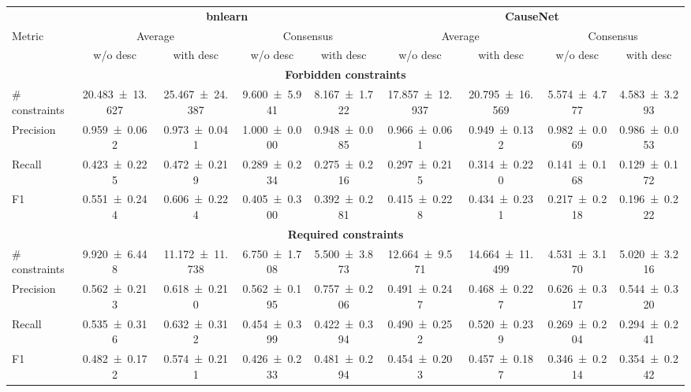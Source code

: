\begin{tabular}{lcccccccc}
\toprule
 & \multicolumn{4}{c}{\textbf{bnlearn}} & \multicolumn{4}{c}{\textbf{CauseNet}} \\
\cmidrule(lr){2-5} \cmidrule(lr){6-9}
Metric & \multicolumn{2}{c}{Average} & \multicolumn{2}{c}{Consensus} & \multicolumn{2}{c}{Average} & \multicolumn{2}{c}{Consensus} \\
\cmidrule(lr){2-3} \cmidrule(lr){4-5} \cmidrule(lr){6-7} \cmidrule(lr){8-9}
 & w/o desc & with desc & w/o desc & with desc & w/o desc & with desc & w/o desc & with desc \\
\midrule
\multicolumn{9}{c}{\textbf{Forbidden constraints}} \\
\midrule
# constraints & \num{20.483+-13.627} & \num{25.467+-24.387} & \num{9.600+-5.941} & \num{8.167+-1.722} & \num{17.857+-12.937} & \num{20.795+-16.569} & \num{5.574+-4.777} & \num{4.583+-3.293} \\
Precision & \num{0.959+-0.062} & \num{0.973+-0.041} & \num{1.000+-0.000} & \num{0.948+-0.085} & \num{0.966+-0.061} & \num{0.949+-0.132} & \num{0.982+-0.069} & \num{0.986+-0.053} \\
Recall & \num{0.423+-0.225} & \num{0.472+-0.219} & \num{0.289+-0.234} & \num{0.275+-0.216} & \num{0.297+-0.215} & \num{0.314+-0.220} & \num{0.141+-0.168} & \num{0.129+-0.172} \\
F1 & \num{0.551+-0.244} & \num{0.606+-0.224} & \num{0.405+-0.300} & \num{0.392+-0.281} & \num{0.415+-0.228} & \num{0.434+-0.231} & \num{0.217+-0.218} & \num{0.196+-0.222} \\
\multicolumn{9}{c}{\textbf{Required constraints}} \\
\midrule
# constraints & \num{9.920+-6.448} & \num{11.172+-11.738} & \num{6.750+-1.708} & \num{5.500+-3.873} & \num{12.664+-9.571} & \num{14.664+-11.499} & \num{4.531+-3.170} & \num{5.020+-3.216} \\
Precision & \num{0.562+-0.213} & \num{0.618+-0.210} & \num{0.562+-0.195} & \num{0.757+-0.206} & \num{0.491+-0.247} & \num{0.468+-0.227} & \num{0.626+-0.317} & \num{0.544+-0.320} \\
Recall & \num{0.535+-0.316} & \num{0.632+-0.312} & \num{0.454+-0.399} & \num{0.422+-0.394} & \num{0.490+-0.252} & \num{0.520+-0.239} & \num{0.269+-0.204} & \num{0.294+-0.241} \\
F1 & \num{0.482+-0.172} & \num{0.574+-0.211} & \num{0.426+-0.233} & \num{0.481+-0.294} & \num{0.454+-0.203} & \num{0.457+-0.187} & \num{0.346+-0.214} & \num{0.354+-0.242} \\
\bottomrule
\end{tabular}
